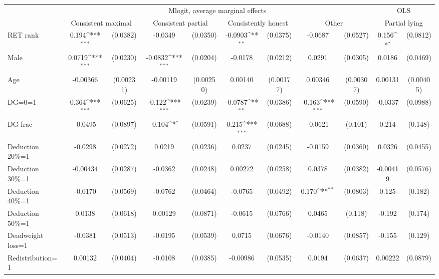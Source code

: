\def\sym#1{\ifmmode^{#1}\else\(^{#1}\)\fi}
\begin{tabular}{l|cccccccc|cc}
\hline\hline
&\multicolumn{8}{c|}{Mlogit, average marginal effects }&\multicolumn{2}{c}{OLS}\\
                &\multicolumn{2}{c}{Consistent maximal}&\multicolumn{2}{c}{Consistent partial}&\multicolumn{2}{c}{Consistently honest}&\multicolumn{2}{c}{Other}   &\multicolumn{2}{c}{Partial lying}\\
\hline
RET rank        &    0.194\sym{***}& (0.0382)&  -0.0349         & (0.0350)&  -0.0903\sym{**} & (0.0375)&  -0.0687         & (0.0527)&    0.156\sym{*}  & (0.0812)\\
Male            &   0.0719\sym{***}& (0.0230)&  -0.0832\sym{***}& (0.0204)&  -0.0178         & (0.0212)&   0.0291         & (0.0305)&   0.0186         & (0.0469)\\
Age             & -0.00366         &(0.00231)& -0.00119         &(0.00250)&  0.00140         &(0.00177)&  0.00346         &(0.00307)&  0.00131         &(0.00405)\\
DG=0=1          &    0.364\sym{***}& (0.0625)&   -0.122\sym{***}& (0.0239)&  -0.0787\sym{**} & (0.0386)&   -0.163\sym{***}& (0.0590)&  -0.0337         & (0.0988)\\
DG frac         &  -0.0495         & (0.0897)&   -0.104\sym{*}  & (0.0591)&    0.215\sym{***}& (0.0688)&  -0.0621         &  (0.101)&    0.214         &  (0.148)\\
Deduction 20\%=1&  -0.0298         & (0.0272)&   0.0219         & (0.0236)&   0.0237         & (0.0245)&  -0.0159         & (0.0360)&   0.0326         & (0.0455)\\
Deduction 30\%=1& -0.00434         & (0.0287)&  -0.0362         & (0.0248)&  0.00272         & (0.0258)&   0.0378         & (0.0382)& -0.00419         & (0.0576)\\
Deduction 40\%=1&  -0.0170         & (0.0569)&  -0.0762         & (0.0464)&  -0.0765         & (0.0492)&    0.170\sym{**} & (0.0803)&    0.125         &  (0.182)\\
Deduction 50\%=1&   0.0138         & (0.0618)&  0.00129         & (0.0871)&  -0.0615         & (0.0766)&   0.0465         &  (0.118)&   -0.192         &  (0.174)\\
Deadweight loss=1&  -0.0381         & (0.0513)&  -0.0195         & (0.0539)&   0.0715         & (0.0676)&  -0.0140         & (0.0857)&   -0.155         &  (0.129)\\
Redistribution=1&  0.00132         & (0.0404)&  -0.0108         & (0.0385)& -0.00986         & (0.0535)&   0.0194         & (0.0637)&  0.00222         & (0.0879)\\

\end{tabular}
